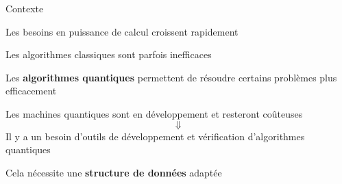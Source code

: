 \begin{frame}{Contexte}

\begin{center}
  Les besoins en puissance de calcul croissent rapidement
  

  Les algorithmes classiques sont parfois inefficaces

  \pause
  Les \textbf{algorithmes quantiques} permettent de résoudre certains problèmes plus efficacement
  \end{center}
\end{frame}

\begin{frame}
  Les machines quantiques sont en développement et resteront coûteuses
  $$\Downarrow$$
  Il y a un besoin d'outils de développement et vérification d'algorithmes quantiques
  \pause

  \vspace{1em}
  Cela nécessite une \textbf{structure de données} adaptée
\end{frame}
